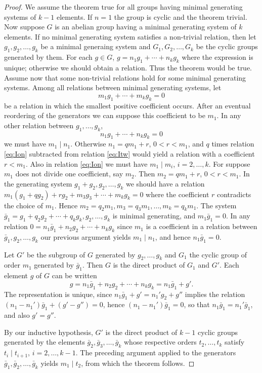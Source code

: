 \documentclass[10pt,leqno]{article}
\theoremstyle{definition}
\begin{document}
\begin{proof}
We assume the theorem true for all groups having minimal generating systems of $k-1$ elements.
If $n=1$ the group is cyclic and the theorem trivial.
Now suppose $G$ is an abelian group having a minimal generating system of $k$ elements.
If no minimal generating system satisfies a non-trivial relation, then let $g_1,g_2, \ldots, g_k$ be a minimal generaing system and $G_1, G_2, \ldots, G_k$ be the cyclic groups generated by them.
For each $g \in G$, $g = n_1g_1 + \cdots + n_kg_k$ where the expression is unique; otherwise we should obtain a relation.
Thus the theorem would be true.
Assume now that some non-trivial relations hold for some minimal generating systems.
Among all relations between minimal generating systems, let
\begin{equation}
\label{eq:Ion}
m_1 g_1 + \cdots + m_k g_k = 0
\end{equation}
be a relation in which the smallest positive coefficient occurs.
After an eventual reordering of the generators we can suppose this coefficient to be $m_1$.
In any other relation between $g_1, \ldots, g_k$,
\begin{equation}
\label{eq:Itw}
n_1g_1 + \cdots + n_kg_k = 0
\end{equation}
we must have $m_1 \mid n_1$.
Otherwise $n_1 = q m_1 + r$, $0 < r < m_1$, and $q$ times relation \eqref{eq:Ion} subtracted from relation \eqref{eq:Itw} would yield a relation with a coefficient $r < m_1$.
Also in relation \eqref{eq:Ion} we must have $m_1 \mid m_i$, $i = 2, \ldots, k$.
For suppose $m_1$ does not divide one coefficient, say $m_2$.
Then $m_2 = q m_1 + r$, $0 < r < m_1$.
In the generating system $g_1+g_2, g_2,\ldots,g_k$ we should have a relation $m_1(g_1 + qg_2) + rg_2 + m_3g_3 + \cdots + m_k g_k = 0$ where the coefficient $r$ contradicts the choice of $m_1$.
Hence $m_2 = q_2 m_1, m_3 = q_3 m_1, \ldots, m_k = q_k m_1$.
The system $\bar g_1 = g_1 + q_2g_2 + \cdots + q_k g_k, g_2, \ldots, g_k$ is minimal generating, and $m_1 \bar g_1 = 0$.
In any relation $0 = n_1 \bar g_1 + n_2 g_2 + \cdots + n_k g_k$ since $m_1$ is a coefficient in a relation between $\bar g_1, g_2, \ldots, g_k$ our previous argument yields $m_1 \mid n_1$, and hence $n_1 \bar g_1 = 0$.

Let $G'$ be the subgroup of $G$ generated by $g_2, \ldots, g_k$ and $G_1$ the cyclic group of order $m_1$ generated by $\bar g_1$.
Then $G$ is the direct product of $G_1$ and $G'$.
Each element $g$ of $G$ can be written
\[
g = n_1 \bar g_1 + n_2 g_2 + \cdots + n_k g_k
= n_1 \bar g_1 + g'.
\]
The representation is unique, since $n_1 \bar g_1 + g' = n_1' g_2 + g''$ implies the relation $(n_1 - n_1') \bar g_1 + (g' - g'') = 0$, hence $(n_1 - n_1') \bar g_1 = 0$, so that $n_1 \bar g_1 = n_1' \bar g_1$, and also $g' = g''$.

By our inductive hypothesis, $G'$ is the direct product of $k-1$ cyclic groups generated by the elements $\bar g_2, \bar g_3, \ldots, \bar g_k$ whose respective orders $t_2, \ldots, t_k$ satisfy $t_i \mid t_{i+1}$, $i = 2,\ldots,k-1$.
The preceding argument applied to the generators $\bar g_1, \bar g_2, \ldots, \bar g_k$ yields $m_1 \mid t_2$, from which the theorem follows.
\end{proof}
\end{document}

